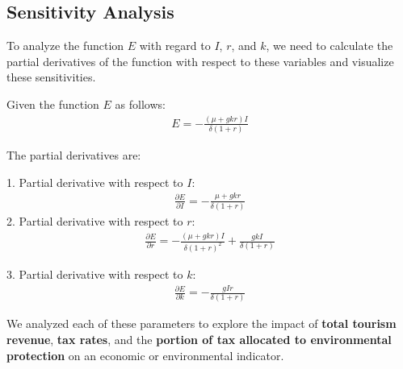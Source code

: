 \documentclass[UTF8]{mcmthesis}
\begin{document}
        
        \subsection{Sensitivity Analysis}
        \hspace*{2em}To analyze the function \( E \) with regard to \( I \), \( r \), and \( k \), we need to calculate the partial derivatives of the function with respect to these variables and visualize these sensitivities.

        Given the function \( E \) as follows:
        \begin{equation}
            \begin{aligned}
            E = -\frac{(\mu + gkr)I}{\delta(1 + r)}
            \end{aligned}
            \end{equation}
            
        The partial derivatives are:

        1. Partial derivative with respect to \( I \):
        \begin{equation}
            \begin{aligned}
            \frac{\partial E}{\partial I} = -\frac{\mu + gkr}{\delta(1 + r)}
            \end{aligned}
            \end{equation}
        \hspace*{2em}2. Partial derivative with respect to \( r \):
        \begin{equation}
            \begin{aligned}
            \frac{\partial E}{\partial r} = -\frac{(\mu + gkr)I}{\delta(1 + r)^2} + \frac{gkI}{\delta(1 + r)}
            \end{aligned}
            \end{equation}

        3. Partial derivative with respect to \( k \):
        \begin{equation}
            \begin{aligned}
            \frac{\partial E}{\partial k} = -\frac{gIr}{\delta(1 + r)}
            \end{aligned}
            \end{equation}
    
            We analyzed each of these parameters to explore the impact of \textbf{total tourism revenue}, \textbf{tax rates}, and the \textbf{portion of tax allocated to environmental protection} on an economic or environmental indicator.
\end{document}
